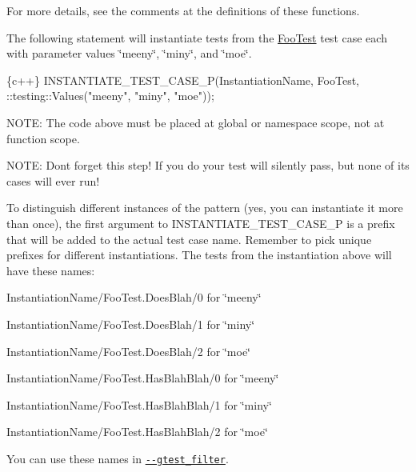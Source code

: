 For more details, see the comments at the definitions of these functions.

The following statement will instantiate tests from the {\ttfamily \mbox{\hyperlink{class_foo_test}{Foo\+Test}}} test case each with parameter values {\ttfamily \char`\"{}meeny\char`\"{}}, {\ttfamily \char`\"{}miny\char`\"{}}, and {\ttfamily \char`\"{}moe\char`\"{}}.


\begin{DoxyCode}
\{c++\}
INSTANTIATE\_TEST\_CASE\_P(InstantiationName,
                        FooTest,
                        ::testing::Values("meeny", "miny", "moe"));
\end{DoxyCode}


N\+O\+TE\+: The code above must be placed at global or namespace scope, not at function scope.

N\+O\+TE\+: Don\textquotesingle{}t forget this step! If you do your test will silently pass, but none of its cases will ever run!

To distinguish different instances of the pattern (yes, you can instantiate it more than once), the first argument to {\ttfamily I\+N\+S\+T\+A\+N\+T\+I\+A\+T\+E\+\_\+\+T\+E\+S\+T\+\_\+\+C\+A\+S\+E\+\_\+P} is a prefix that will be added to the actual test case name. Remember to pick unique prefixes for different instantiations. The tests from the instantiation above will have these names\+:


\begin{DoxyItemize}
\item {\ttfamily Instantiation\+Name/\+Foo\+Test.\+Does\+Blah/0} for {\ttfamily \char`\"{}meeny\char`\"{}}
\item {\ttfamily Instantiation\+Name/\+Foo\+Test.\+Does\+Blah/1} for {\ttfamily \char`\"{}miny\char`\"{}}
\item {\ttfamily Instantiation\+Name/\+Foo\+Test.\+Does\+Blah/2} for {\ttfamily \char`\"{}moe\char`\"{}}
\item {\ttfamily Instantiation\+Name/\+Foo\+Test.\+Has\+Blah\+Blah/0} for {\ttfamily \char`\"{}meeny\char`\"{}}
\item {\ttfamily Instantiation\+Name/\+Foo\+Test.\+Has\+Blah\+Blah/1} for {\ttfamily \char`\"{}miny\char`\"{}}
\item {\ttfamily Instantiation\+Name/\+Foo\+Test.\+Has\+Blah\+Blah/2} for {\ttfamily \char`\"{}moe\char`\"{}}
\end{DoxyItemize}

You can use these names in \href{#running-a-subset-of-the-tests}{\tt {\ttfamily -\/-\/gtest\+\_\+filter}}.

